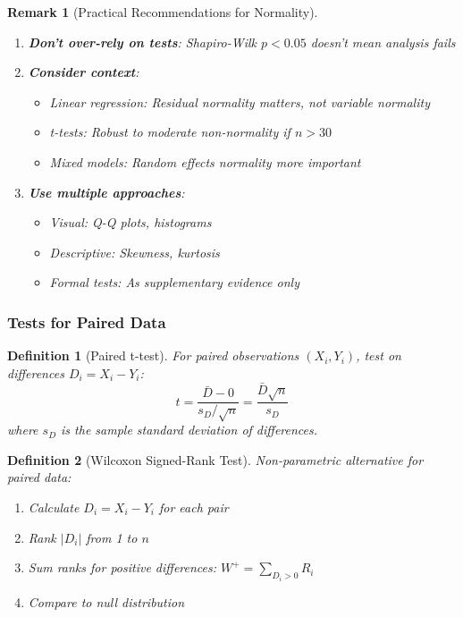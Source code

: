 \documentclass{article}
\newtheorem{definition}{Definition}
\newtheorem{remark}{Remark}
\begin{document}
\begin{remark}[Practical Recommendations for Normality]
\begin{enumerate}
    \item \textbf{Don't over-rely on tests}: Shapiro-Wilk $p < 0.05$ doesn't mean analysis fails
    \item \textbf{Consider context}:
    \begin{itemize}
        \item Linear regression: Residual normality matters, not variable normality
        \item t-tests: Robust to moderate non-normality if $n > 30$
        \item Mixed models: Random effects normality more important
    \end{itemize}
    \item \textbf{Use multiple approaches}:
    \begin{itemize}
        \item Visual: Q-Q plots, histograms
        \item Descriptive: Skewness, kurtosis
        \item Formal tests: As supplementary evidence only
    \end{itemize}
\end{enumerate}
\end{remark}

\subsubsection{Tests for Paired Data}

\begin{definition}[Paired t-test]
For paired observations $(X_i, Y_i)$, test on differences $D_i = X_i - Y_i$:
\begin{equation}
t = \frac{\bar{D} - 0}{s_D/\sqrt{n}} = \frac{\bar{D}\sqrt{n}}{s_D}
\end{equation}
where $s_D$ is the sample standard deviation of differences.
\end{definition}

\begin{definition}[Wilcoxon Signed-Rank Test]
Non-parametric alternative for paired data:
\begin{enumerate}
    \item Calculate $D_i = X_i - Y_i$ for each pair
    \item Rank $|D_i|$ from 1 to $n$
    \item Sum ranks for positive differences: $W^+ = \sum_{D_i > 0} R_i$
    \item Compare to null distribution
\end{enumerate}
\end{definition}
\end{document}
